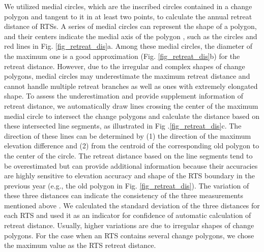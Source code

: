 \documentclass[authoryear,preprint,review,12pt]{elsarticle}
\begin{document}
We utilized medial circles, which are the inscribed circles contained in a change polygon and tangent to it in at least two points, to calculate the annual retreat distance of RTSs. 
A series of medial circles can represent the shape of a polygon, and their centers indicate the medial axis of the polygon \citep{zhu2014computing}, such as the circles and red lines in Fig. \ref{fig_retreat_dis}a. 
Among these medial circles, the diameter of the maximum one is a good approximation (Fig. \ref{fig_retreat_dis}b) for the retreat distance.
However, due to the irregular and complex  shapes of change polygons, medial circles may underestimate the maximum retreat distance and cannot handle multiple retreat branches as well as ones with extremely elongated shape. 
To assess the underestimation and provide supplement information of retreat distance, we automatically draw lines crossing the center of the maximum medial circle to intersect the change polygons and calculate the distance based on these intersected line segments, as illustrated in Fig .\ref{fig_retreat_dis}c. 
The direction of these lines can be determined by (1) the direction of the maximum elevation difference and (2) from the centroid of the corresponding old polygon to the center of the circle. 
The retreat distance based on the line segments tend to be overestimated but can provide additional information because their accuracies are highly sensitive to elevation accuracy and shape of the RTS boundary in the previous year (e.g., the old polygon in Fig. \ref{fig_retreat_dis}). 
The variation of these three distances can indicate the consistency of the three measurements mentioned above . %
We calculated the standard deviation of the three distances for each RTS and used it as an indicator for confidence of automatic calculation of retreat distance. 
Usually, higher variations are due to irregular shapes of change polygons. 
For the case when an RTS contains several change polygons, we chose the maximum value as the RTS retreat distance.
\end{document}
